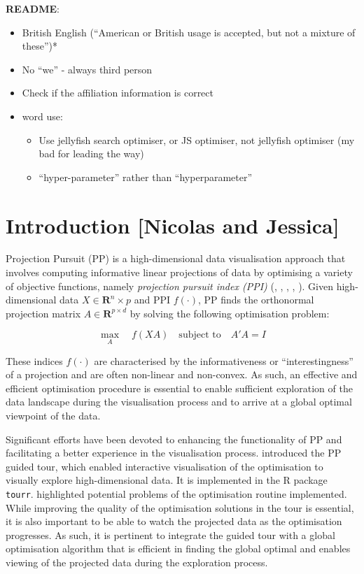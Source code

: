 \documentclass[
  number,
  preprint,
  3p]{elsarticle}
\providecommand{\tightlist}{%
  \setlength{\itemsep}{0pt}\setlength{\parskip}{0pt}}\usepackage{longtable,booktabs,array}
\begin{document}
\textbf{README}:

\begin{itemize}
\item
  British English (``American or British usage is accepted, but not a
  mixture of these'')*
\item
  No ``we'' - always third person
\item
  Check if the affiliation information is correct
\item
  word use:

  \begin{itemize}
  \tightlist
  \item
    Use jellyfish search optimiser, or JS optimiser, not jellyfish
    optimiser (my bad for leading the way)
  \item
    ``hyper-parameter'' rather than ``hyperparameter''
  \end{itemize}
\end{itemize}

\hypertarget{introduction-nicolas-and-jessica}{%
\section{Introduction {[}Nicolas and
Jessica{]}}\label{introduction-nicolas-and-jessica}}

Projection Pursuit (PP) is a high-dimensional data visualisation
approach that involves computing informative linear projections of data
by optimising a variety of objective functions, namely \emph{projection
pursuit index (PPI)} (\citet{hall1989polynomial},
\citet{cook1993projection}, \citet{lee2010projection},
\citet{Loperfido2018}, \citet{Loperfido2020}). Given high-dimensional
data \(X \in \mathbf{R}^{n }\times p\) and PPI \(f(\cdot)\), PP finds
the orthonormal projection matrix \(A \in \mathbf{R}^{p \times d}\) by
solving the following optimisation problem:

\[
\underset{A}{\max } \quad f(XA) \quad \text{subject to} \quad A'A = I
\]

These indices \(f(\cdot)\) are characterised by the informativeness or
``interestingness'' of a projection and are often non-linear and
non-convex. As such, an effective and efficient optimisation procedure
is essential to enable sufficient exploration of the data landscape
during the visualisation process and to arrive at a global optimal
viewpoint of the data.

Significant efforts have been devoted to enhancing the functionality of
PP and facilitating a better experience in the visualisation process.
\citet{cook1995grand} introduced the PP guided tour, which enabled
interactive visualisation of the optimisation to visually explore
high-dimensional data. It is implemented in the R \citep{R} package
\texttt{tourr}\citep{tourr}. \citet{RJ-2021-105} highlighted potential
problems of the optimisation routine implemented. While improving the
quality of the optimisation solutions in the tour is essential, it is
also important to be able to watch the projected data as the
optimisation progresses. As such, it is pertinent to integrate the
guided tour with a global optimisation algorithm that is efficient in
finding the global optimal and enables viewing of the projected data
during the exploration process.
\end{document}
